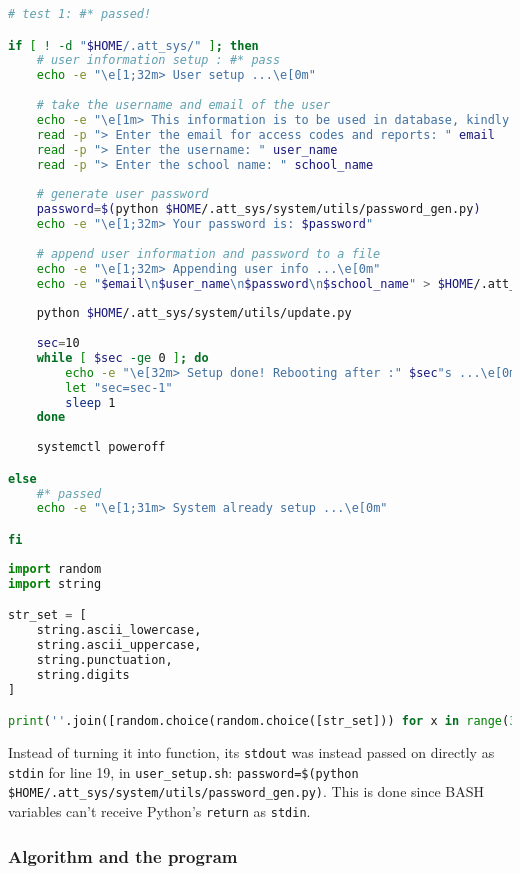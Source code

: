 \documentclass[12pt]{article}
\begin{document}
\singlespacing
\begin{lstlisting}[language=bash, caption={\texttt{user\_setup.sh}}]
# test 1: #* passed!

if [ ! -d "$HOME/.att_sys/" ]; then
	# user information setup : #* pass
	echo -e "\e[1;32m> User setup ...\e[0m"
	
	# take the username and email of the user
	echo -e "\e[1m> This information is to be used in database, kindly use correct punctuation.\e[0m"
	read -p "> Enter the email for access codes and reports: " email
	read -p "> Enter the username: " user_name
	read -p "> Enter the school name: " school_name
	
	# generate user password
	password=$(python $HOME/.att_sys/system/utils/password_gen.py)
	echo -e "\e[1;32m> Your password is: $password"
	
	# append user information and password to a file
	echo -e "\e[1;32m> Appending user info ...\e[0m"
	echo -e "$email\n$user_name\n$password\n$school_name" > $HOME/.att_sys/user_info
	
	python $HOME/.att_sys/system/utils/update.py
	
	sec=10
	while [ $sec -ge 0 ]; do
		echo -e "\e[32m> Setup done! Rebooting after :" $sec"s ...\e[0m\r" 
		let "sec=sec-1"
		sleep 1
	done
	
	systemctl poweroff

else
	#* passed
	echo -e "\e[1;31m> System already setup ...\e[0m"

fi
\end{lstlisting}

\singlespacing
\begin{lstlisting}[language=Python, caption={\texttt{user\_setup.sh}}]
import random
import string

str_set = [
	string.ascii_lowercase,
	string.ascii_uppercase,
	string.punctuation,
	string.digits
]

print(''.join([random.choice(random.choice([str_set])) for x in range(32)]))
\end{lstlisting}
\doublespacing

Instead of turning it into function, its \texttt{stdout} was instead passed on directly as \texttt{stdin} for line 19, in \texttt{user\_setup.sh}: \texttt{password=\$(python \$HOME/.att\_sys/system/utils/password\_gen.py)}. This is done since BASH variables can't receive Python's \texttt{return} as \texttt{stdin}.

\subsubsection*{Algorithm and the program}
\end{document}
